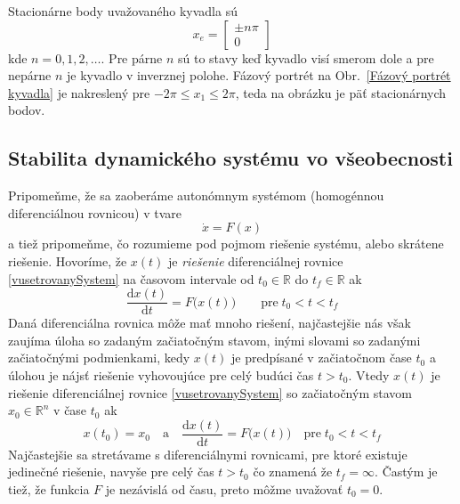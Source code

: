 \documentclass[a4paper, 10pt, ]{article}
\begin{document}
Stacionárne body uvažovaného kyvadla sú
\begin{equation}
	x_e = \begin{bmatrix} \pm n \pi \\ 0 \end{bmatrix}
\end{equation}
kde $n = 0,1,2,\ldots$. Pre párne $n$ sú to stavy keď kyvadlo visí smerom dole a pre nepárne $n$ je kyvadlo v inverznej polohe. Fázový portrét na Obr.~\ref{Fázový portrét kyvadla} je nakreslený pre $-2\pi \leq x_1 \leq 2\pi$, teda na obrázku je päť stacionárnych bodov.







\subsection{Stabilita dynamického systému vo všeobecnosti}


Pripomeňme, že sa zaoberáme autonómnym systémom (homogénnou diferenciálnou rovnicou) v tvare
\begin{equation} \label{vusetrovanySystem}
	\dot{x} = F(x)
\end{equation}
a tiež pripomeňme, čo rozumieme pod pojmom riešenie systému, alebo skrátene riešenie. Hovoríme, že $x(t)$ je \emph{riešenie} diferenciálnej rovnice \eqref{vusetrovanySystem} na časovom intervale od $t_0 \in \mathbb{R}$ do $t_f \in \mathbb{R}$ ak
\begin{equation}
	\frac{\text{d}x(t)}{\text{d}t} = F \big( x(t)  \big) \qquad \text{pre} \; t_0 < t < t_f
\end{equation}
Daná diferenciálna rovnica môže mať mnoho riešení, najčastejšie nás však zaujíma úloha so zadaným začiatočným stavom, inými slovami so zadanými začiatočnými podmienkami, kedy $x(t)$ je predpísané v začiatočnom čase $t_0$ a úlohou je nájsť riešenie vyhovoujúce pre celý budúci čas $t>t_0$. Vtedy $x(t)$ je riešenie diferenciálnej rovnice \eqref{vusetrovanySystem} so začiatočným stavom $x_0 \in \mathbb{R}^n$ v čase $t_0$ ak
\begin{equation}
	x(t_0) = x_0 \quad \text{a} \quad \frac{\text{d}x(t)}{\text{d}t} = F \big( x(t)  \big) \quad \text{pre} \; t_0 < t < t_f
\end{equation}
Najčastejšie sa stretávame s diferenciálnymi rovnicami, pre ktoré existuje jedinečné riešenie, navyše pre celý čas $t>t_0$ čo znamená že $t_f = \infty$. Častým je tiež, že funkcia $F$ je nezávislá od času, preto môžme uvažovať $t_0 = 0$.
\end{document}
